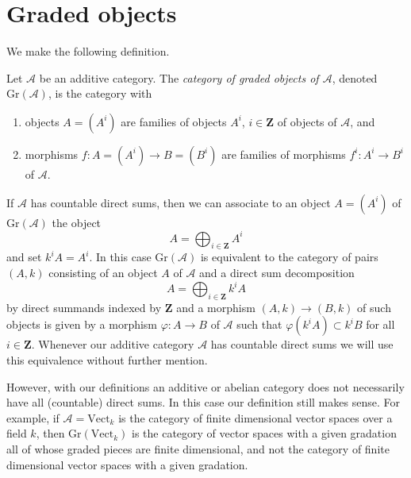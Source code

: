 

















\section{Graded objects}
\label{section-graded}

\noindent
We make the following definition.

\begin{definition}
\label{definition-graded}
Let $\mathcal{A}$ be an additive category. The {\it category of graded
objects of $\mathcal{A}$}, denoted $\text{Gr}(\mathcal{A})$, is
the category with
\begin{enumerate}
\item objects $A = (A^i)$ are families of objects $A^i$, $i \in \mathbf{Z}$
of objects of $\mathcal{A}$, and
\item morphisms $f : A = (A^i) \to B = (B^i)$ are families of
morphisms $f^i : A^i \to B^i$ of $\mathcal{A}$.
\end{enumerate}
\end{definition}

\noindent
If $\mathcal{A}$ has countable direct sums, then we can associate to
an object $A = (A^i)$ of $\text{Gr}(\mathcal{A})$ the object
$$
A = \bigoplus\nolimits_{i \in \mathbf{Z}} A^i
$$
and set $k^iA = A^i$. In this case $\text{Gr}(\mathcal{A})$ is equivalent
to the category of pairs $(A, k)$ consisting of an object $A$ of
$\mathcal{A}$ and a direct sum decomposition
$$
A = \bigoplus\nolimits_{i \in \mathbf{Z}} k^iA
$$
by direct summands indexed by $\mathbf{Z}$ and a morphism $(A, k) \to (B, k)$
of such objects is given by a morphism $\varphi : A \to B$ of $\mathcal{A}$
such that $\varphi(k^iA) \subset k^iB$ for all $i \in \mathbf{Z}$. Whenever
our additive category $\mathcal{A}$ has countable direct sums we will
use this equivalence without further mention.

\medskip\noindent
However, with our definitions an additive or abelian category does not
necessarily have all (countable) direct sums. In this case our definition
still makes sense. For example, if $\mathcal{A} = \text{Vect}_k$ is the
category of finite dimensional vector spaces over a field $k$, then
$\text{Gr}(\text{Vect}_k)$ is the category of vector
spaces with a given gradation all of whose graded pieces are finite
dimensional, and not the category of finite dimensional vector
spaces with a given gradation.

